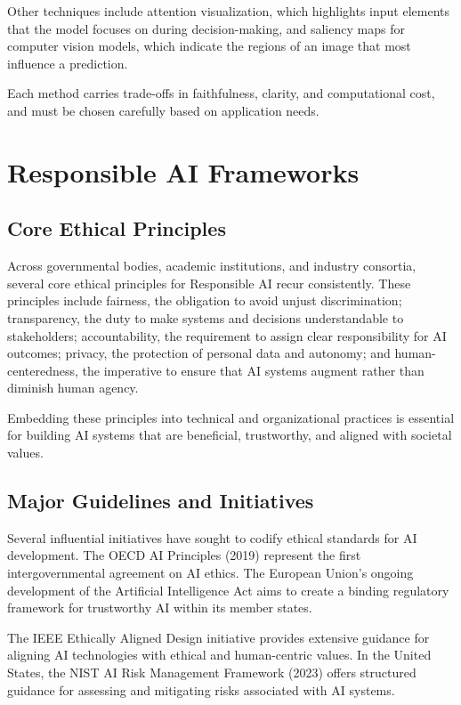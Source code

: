\documentclass[openany]{book}
\begin{document}
Other techniques include attention visualization, which highlights input
elements that the model focuses on during decision-making, and saliency maps for
computer vision models, which indicate the regions of an image that most
influence a prediction.

Each method carries trade-offs in faithfulness, clarity, and computational cost,
and must be chosen carefully based on application needs.

\section{Responsible AI Frameworks}

\subsection{Core Ethical Principles}

Across governmental bodies, academic institutions, and industry consortia,
several core ethical principles for Responsible AI recur consistently. These
principles include fairness, the obligation to avoid unjust discrimination;
transparency, the duty to make systems and decisions understandable to
stakeholders; accountability, the requirement to assign clear responsibility
for AI outcomes; privacy, the protection of personal data and autonomy; and
human-centeredness, the imperative to ensure that AI systems augment rather than
diminish human agency.

Embedding these principles into technical and organizational practices is
essential for building AI systems that are beneficial, trustworthy, and aligned
with societal values.

\subsection{Major Guidelines and Initiatives}

Several influential initiatives have sought to codify ethical standards for AI
development. The OECD AI Principles (2019) represent the first intergovernmental
agreement on AI ethics. The European Union’s ongoing development of the
Artificial Intelligence Act aims to create a binding regulatory framework for
trustworthy AI within its member states.

The IEEE Ethically Aligned Design initiative provides extensive guidance for
aligning AI technologies with ethical and human-centric values. In the United
States, the NIST AI Risk Management Framework (2023) offers structured guidance
for assessing and mitigating risks associated with AI systems.
\end{document}
